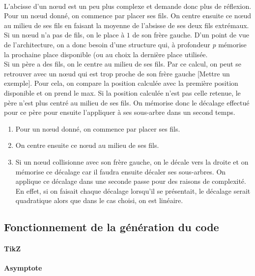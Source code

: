 \paragraph{}L'abcisse d'un n\oe ud est un peu plus complexe et demande donc plus de réflexion. Pour un n\oe ud donné, on commence par placer ses fils. On centre ensuite ce n\oe ud au milieu de ses fils en faisant la moyenne de l'absisse de ses deux fils extrémaux. Si un n\oe ud n'a pas de fils, on le place à $1$ de son frère gauche. D'un point de vue de l'architecture, on a donc besoin d'une structure qui, à profondeur \emph{p} mémorise la prochaine place disponible (ou au choix la dernière place utilisée.\\
Si un père a des fils, on le centre au milieu de ses fils. Par ce calcul, on peut se retrouver avec un n\oe ud qui est trop proche de son frère gauche [Mettre un exemple]. Pour cela, on compare la position calculée avec la première position disponible et on prend le max. Si la position calculée n'est pas celle retenue, le père n'est plus centré au milieu de ses fils. On mémorise donc le décalage effectué pour ce père pour ensuite l'appliquer à ses sous-arbre dans un second temps.
\begin{enumerate}
	\item Pour un n\oe ud donné, on commence par placer ses fils.
	\item On centre ensuite ce n\oe ud au milieu de ses fils.
	\item Si un n\oe ud collisionne avec son frère gauche, on le décale vers la droite et on mémorise ce décalage car il faudra ensuite décaler ses sous-arbres. On applique ce décalage dans une seconde passe pour des raisons de complexité. En effet, si on faisait chaque décalage lorsqu'il se présentait, le décalage serait quadratique alors que dans le cas choisi, on est linéaire.
\end{enumerate}

	\subsection{Fonctionnement de la génération du code}
	
\paragraph{TikZ}
		
\paragraph{Asymptote}
		
